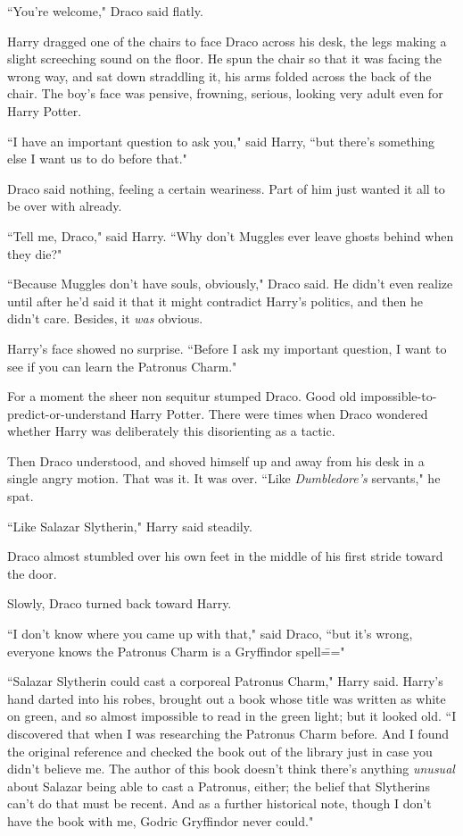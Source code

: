 ``You're welcome," Draco said flatly.

Harry dragged one of the chairs to face Draco across his desk, the legs making a slight screeching sound on the floor. He spun the chair so that it was facing the wrong way, and sat down straddling it, his arms folded across the back of the chair. The boy's face was pensive, frowning, serious, looking very adult even for Harry Potter.

``I have an important question to ask you," said Harry, ``but there's something else I want us to do before that."

Draco said nothing, feeling a certain weariness. Part of him just wanted it all to be over with already.

``Tell me, Draco," said Harry. ``Why don't Muggles ever leave ghosts behind when they die?"

``Because Muggles don't have souls, obviously," Draco said. He didn't even realize until after he'd said it that it might contradict Harry's politics, and then he didn't care. Besides, it \emph{was} obvious.

Harry's face showed no surprise. ``Before I ask my important question, I want to see if you can learn the Patronus Charm."

For a moment the sheer non sequitur stumped Draco. Good old impossible-to-predict-or-understand Harry Potter. There were times when Draco wondered whether Harry was deliberately this disorienting as a tactic.

Then Draco understood, and shoved himself up and away from his desk in a single angry motion. That was it. It was over. ``Like \emph{Dumbledore's} servants," he spat.

``Like Salazar Slytherin," Harry said steadily.

Draco almost stumbled over his own feet in the middle of his first stride toward the door.

Slowly, Draco turned back toward Harry.

``I don't know where you came up with that," said Draco, ``but it's wrong, everyone knows the Patronus Charm is a Gryffindor spell\==="

``Salazar Slytherin could cast a corporeal Patronus Charm," Harry said. Harry's hand darted into his robes, brought out a book whose title was written as white on green, and so almost impossible to read in the green light; but it looked old. ``I discovered that when I was researching the Patronus Charm before. And I found the original reference and checked the book out of the library just in case you didn't believe me. The author of this book doesn't think there's anything \emph{unusual} about Salazar being able to cast a Patronus, either; the belief that Slytherins can't do that must be recent. And as a further historical note, though I don't have the book with me, Godric Gryffindor never could."

